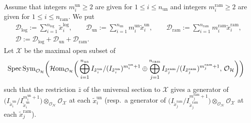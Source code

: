 \documentclass[pdftex]{sigma}
\numberwithin{equation}{section}
\newcommand\Spec{\mathop{\rm Spec}\nolimits}
\begin{document}
Assume that integers $m^{\mathrm{un}}_i\geq 2$ are given for $1\leq i\leq n_{\mathrm{un}}$
and integers $m^{\mathrm{ram}}_i\geq 2$ are given for $1\leq i\leq n_{\mathrm{ram}}$.
We put
\begin{align*}
 &{\mathcal D}_{\mathrm{log}}
 :=
 \sum_{i=1}^{n_{\mathrm{log}}} \tilde{x}^{\mathrm{log}}_i,
 \qquad
 {\mathcal D}_{\mathrm{un}}
 :=
 \sum_{i=1}^{n_{\mathrm{un}}} m^{\mathrm{un}}_i \tilde{x}^{\mathrm{un}}_i,
 \qquad
 {\mathcal D}_{\mathrm{ram}}
 :=
 \sum_{i=1}^{n_{\mathrm{ram}}} m^{\mathrm{ram}}_i \tilde{x}^{\mathrm{ram}}_i,
 \\
 &{\mathcal D}
 :=
 {\mathcal D}_{\mathrm{log}}+{\mathcal D}_{\mathrm{un}}+{\mathcal D}_{\mathrm{ram}}.
\end{align*}
Let ${\mathcal X}$ be the maximal open subset of
\[
 \Spec \mathrm{Sym}_{{\mathcal O}_{\mathcal H}}\bigg(
 {\mathcal H}{\rm om}_{{\mathcal O}_{\mathcal H}}
 \bigg( \bigoplus_{i=1}^{n_{\mathrm{un}}}
 I_{\tilde{x}^{\mathrm{un}}_i}/(I_{\tilde{x}^{\mathrm{un}}_i})^{m^{\mathrm{un}}_i+1}
 \oplus\bigoplus_{j=1}^{n_{\mathrm{ram}}}
 I_{\tilde{x}^{\mathrm{ram}}_j}/(I_{\tilde{x}^{\mathrm{ram}}_j})^{m^{\mathrm{ram}}_j+1},
 \, {\mathcal O}_{\mathcal H} \bigg)\bigg)
\]
such that the restriction $\bar{z}$ of the universal section to ${\mathcal X}$
gives a generator of
$\big(I_{\tilde{x}^{\mathrm{un}}_i}/I_{\tilde{x}^{\mathrm{un}}_i}^{m^{\mathrm{un}}_i+1}\big)
\otimes_{{\mathcal O}_{\mathcal H}} {\mathcal O}_{\mathcal X}$
at each
$\tilde{x}^{\mathrm{un}}_i$
(resp.\ a generator of $\big(I_{\tilde{x}^{\mathrm{ram}}_j}/I_{\tilde{x}^{\mathrm{ram}}_j}^{m^{\mathrm{ram}}_j+1}\big)
\otimes_{{\mathcal O}_{\mathcal H}} {\mathcal O}_{\mathcal X}$
at each $\tilde{x}^{\mathrm{ram}}_j$).
\end{document}
